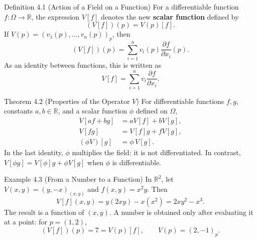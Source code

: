 \documentclass[11pt,letterpaper]{article}
\newcommand{\term}[1]{\textbf{\color{orangeacc}#1}}
\begin{document}
\begin{infobox}[orangeacc]{Definition 4.1 (Action of a Field on a Function)}
For a differentiable function $f:\Omega\to\mathbb{R}$, the expression $V[f]$
denotes the new \term{scalar function} defined by
\begin{equation}
  (V[f])(p)=V(p)[f].
\end{equation}
If $V(p)=(v_1(p),\ldots,v_n(p))_p$, then
\begin{equation}
  (V[f])(p)=\sum_{i=1}^{n}v_i(p)\frac{\partial f}{\partial x_i}(p).
\end{equation}
As an identity between functions, this is written as
\begin{equation}
  V[f]=\sum_{i=1}^{n}v_i\frac{\partial f}{\partial x_i}.
\end{equation}
\end{infobox}

\begin{theorembox}{Theorem 4.2 (Properties of the Operator $V$)}
For differentiable functions $f,g$, constants $a,b\in\mathbb{R}$, and a scalar
function $\phi$ defined on $\Omega$,
\begin{align}
  V[af+bg]&=aV[f]+bV[g],\\
  V[fg]&=V[f]g+fV[g],\\
  (\phi V)[g]&=\phi\,V[g].
\end{align}
In the last identity, $\phi$ multiplies the field: it is not differentiated.
In contrast, $V[\phi g]=V[\phi]g+\phi V[g]$ when $\phi$ is differentiable.
\end{theorembox}

\begin{examplebox}{Example 4.3 (From a Number to a Function)}
In $\mathbb{R}^2$, let $V(x,y)=(y,-x)_{(x,y)}$ and $f(x,y)=x^2y$. Then
\[
  V[f](x,y)=y(2xy)-x(x^2)=2xy^2-x^3.
\]
The result is a function of $(x,y)$. A number is obtained only after evaluating
it at a point: for $p=(1,2)$,
\[
  (V[f])(p)=7=V(p)[f],\qquad V(p)=(2,-1)_p.
\]
\end{examplebox}
\end{document}
